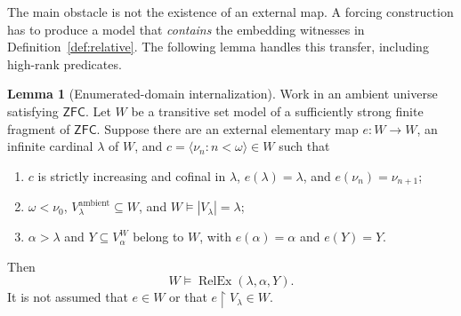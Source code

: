 \documentclass[11pt,letterpaper]{article}
\theoremstyle{definition}
\newtheorem{lemma}[definition]{Lemma}
\newcommand{\ZFC}{\mathsf{ZFC}}
\newcommand{\restr}{\mathbin{\upharpoonright}}
\newcommand{\RelEx}{\operatorname{RelEx}}
\newcommand{\seq}[1]{\langle #1\rangle}
\begin{document}
The main obstacle is not the existence of an external map. A forcing
construction has to produce a model that \emph{contains} the embedding
witnesses in Definition~\ref{def:relative}. The following lemma handles
this transfer, including high-rank predicates.

\begin{lemma}[Enumerated-domain internalization]\label{lem:internal}
Work in an ambient universe satisfying $\ZFC$. Let $W$ be a transitive
set model of a sufficiently strong finite fragment of $\ZFC$. Suppose
there are an external elementary map $e:W\to W$, an infinite cardinal
$\lambda$ of $W$, and $c=\seq{\nu_n:n<\omega}\in W$ such that
\begin{enumerate}
\item $c$ is strictly increasing and cofinal in $\lambda$,
$e(\lambda)=\lambda$, and $e(\nu_n)=\nu_{n+1}$;
\item $\omega<\nu_0$, $V_\lambda^{\mathrm{ambient}}\subseteq W$, and
$W\models |V_\lambda|=\lambda$;
\item $\alpha>\lambda$ and $Y\subseteq V_\alpha^W$ belong to $W$,
with $e(\alpha)=\alpha$ and $e(Y)=Y$.
\end{enumerate}
Then
\[
 W\models\RelEx(\lambda,\alpha,Y).
\]
It is not assumed that $e\in W$ or that $e\restr V_\lambda\in W$.
\end{lemma}
\end{document}
